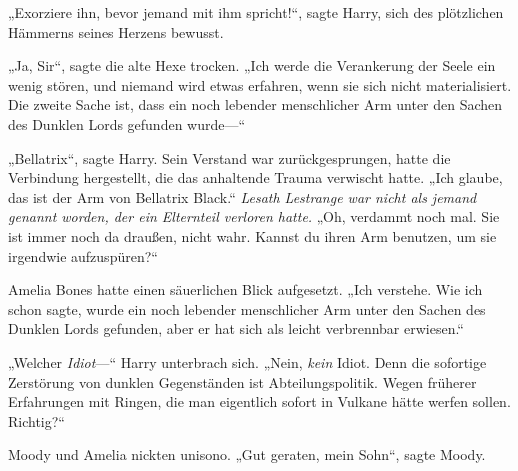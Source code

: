 „Exorziere ihn, bevor jemand mit ihm spricht!“, sagte Harry, sich des plötzlichen Hämmerns seines Herzens bewusst.

„Ja, Sir“, sagte die alte Hexe trocken. „Ich werde die Verankerung der Seele ein wenig stören, und niemand wird etwas erfahren, wenn sie sich nicht materialisiert. Die zweite Sache ist, dass ein noch lebender menschlicher Arm unter den Sachen des Dunklen Lords gefunden wurde—“

„Bellatrix“, sagte Harry.
Sein Verstand war zurückgesprungen, hatte die Verbindung hergestellt, die das anhaltende Trauma verwischt hatte.
„Ich glaube, das ist der Arm von Bellatrix Black.“
\emph{Lesath Lestrange war nicht als jemand genannt worden, der ein Elternteil verloren hatte.}
„Oh, verdammt noch mal. Sie ist immer noch da draußen, nicht wahr. Kannst du ihren Arm benutzen, um sie irgendwie aufzuspüren?“

Amelia Bones hatte einen säuerlichen Blick aufgesetzt.
„Ich verstehe. Wie ich schon sagte, wurde ein noch lebender menschlicher Arm unter den Sachen des Dunklen Lords gefunden, aber er hat sich als leicht verbrennbar erwiesen.“

„Welcher \emph{Idiot}—“
Harry unterbrach sich.
„Nein, \emph{kein} Idiot. Denn die sofortige Zerstörung von dunklen Gegenständen ist Abteilungspolitik. Wegen früherer Erfahrungen mit Ringen, die man eigentlich sofort in Vulkane hätte werfen sollen. Richtig?“

Moody und Amelia nickten unisono.
„Gut geraten, mein Sohn“, sagte Moody.

